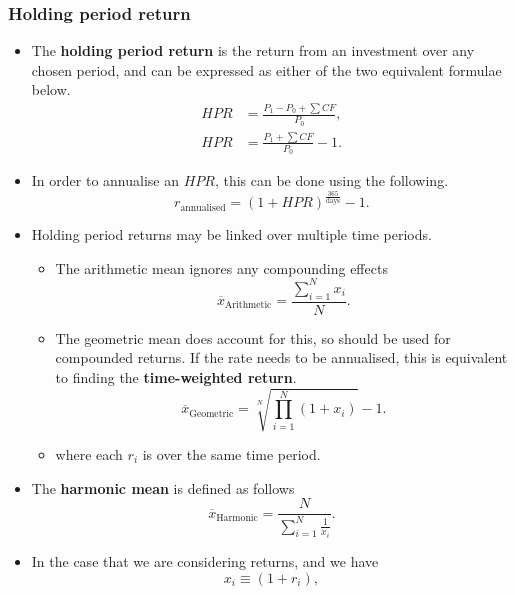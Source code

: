 \documentclass[../notes_compiled.tex]{subfiles}
\begin{document}
\subsubsection{Holding period return}
\label{ssec-hpr}
\begin{itemize}
\item The \textbf{holding period return} is the return from an investment over any chosen period, and can be expressed as either of the two equivalent formulae below.
\begin{align}
HPR &= \frac{P_{1} - P_{0}+\sum CF}{P_{0}}, \label{hpr} \\
HPR &= \frac{P_{1}+\sum CF}{P_{0}}-1.
\end{align}

\item[] In order to annualise an $HPR$, this can be done using the following.
\begin{equation}
r_{\text{annualised}} = (1+HPR)^{\frac{365}{\text{days}}}-1. \label{annualhpr}
\end{equation}


\item Holding period returns may be linked over multiple time periods.
\begin{itemize}
\item The arithmetic mean ignores any compounding effects
\begin{equation}
\overline{x}_{\text{Arithmetic}} = \frac{\sum_{i=1}^{N} x_{i}}{N}.
\end{equation}
\item The geometric mean does account for this, so should be used for compounded returns. If the rate needs to be annualised, this is equivalent to finding the \textbf{time-weighted return}.
\begin{equation}
\overline{x}_{\text{Geometric}} = \sqrt[N]{\prod_{i=1}^{N}(1+x_{i})} - 1.
\end{equation}
\item[] where each $r_{i}$ is over the same time period.
\end{itemize}

\item The \textbf{harmonic mean} is defined as follows
\begin{equation}
\overline{x}_{\text{Harmonic}} = \frac{N}{\sum_{i=1}^{N}\frac{1}{x_{i}}}. \label{harmonic-mean}
\end{equation}

\item[] In the case that we are considering returns, and we have
\begin{equation*}
x_{i} \equiv (1+r_{i}),
\end{equation*}


\end{itemize}
\end{document}
